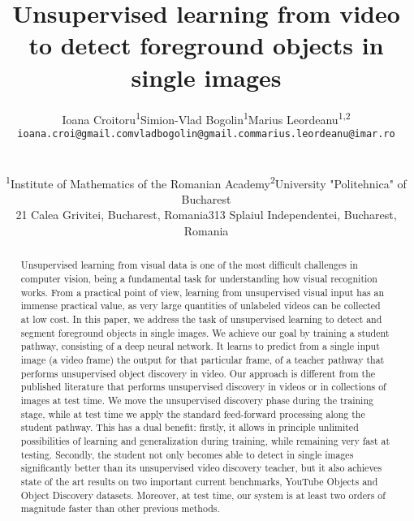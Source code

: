 \documentclass[10pt,twocolumn,letterpaper]{article}
\begin{document}
\title{Unsupervised learning from video \\ to detect foreground objects in single images}

\author{\begin{tabular}{ccc}
Ioana Croitoru\textsuperscript{1} & Simion-Vlad Bogolin\textsuperscript{1} & Marius Leordeanu\textsuperscript{1,2}\\
{\tt\small ioana.croi@gmail.com} & {\tt\small vladbogolin@gmail.com} & {\tt\small marius.leordeanu@imar.ro}\\
\end{tabular}\\
\begin{tabular}{cc}
\textsuperscript{1}Institute of Mathematics of the Romanian Academy & \textsuperscript{2}University "Politehnica" of Bucharest \\
{\small 21 Calea Grivitei, Bucharest, Romania} & {\small 313 Splaiul Independentei, Bucharest, Romania}\\
\end{tabular}
}

\maketitle

\begin{abstract}
    Unsupervised learning from visual data is one of the most difficult challenges in computer vision, 
    being a fundamental task for understanding how visual recognition works. 
    From a practical point of view, learning from unsupervised visual input has an immense practical value, as very large quantities of unlabeled videos can be collected at low cost. In this paper, we address the task of unsupervised learning to detect and segment foreground objects in single images. We achieve our goal by training a student pathway, consisting of a deep neural network. It learns to predict from a single input image (a video frame) the output for that particular frame, of a teacher pathway that performs unsupervised object discovery in video. Our approach is different from the published literature that performs unsupervised discovery in videos or in collections of images at test time. We move the unsupervised discovery phase during the training stage, while at test time we apply the standard feed-forward processing along the student pathway. This has a dual benefit: firstly, it allows in principle unlimited possibilities of learning and generalization during training, while remaining very fast at testing. Secondly, the student not only becomes able to detect in single images significantly better than its unsupervised video discovery teacher, but it also achieves state of the art results on two important current benchmarks, YouTube Objects and Object Discovery datasets. Moreover, at test time, our system is at least two orders of magnitude faster than other previous methods. 
\end{abstract}
\end{document}
